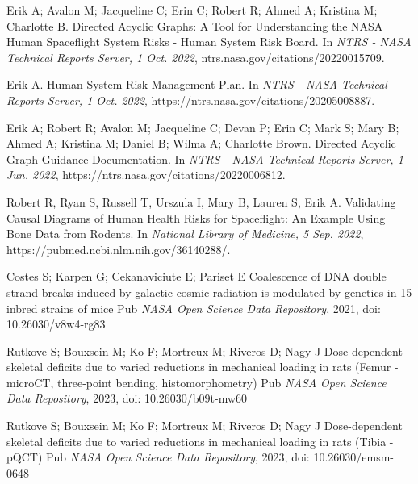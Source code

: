 \documentclass{article}
\begin{document}
  


\begin{thebibliography}{1}


\bibitem{}
Erik A; Avalon M; Jacqueline C; Erin C; Robert R; Ahmed A; Kristina M; Charlotte B.
\newblock Directed Acyclic Graphs: A Tool for Understanding the NASA Human Spaceflight System Risks - Human System Risk Board.
\newblock In {\em NTRS - NASA Technical Reports Server, 1 Oct. 2022}, ntrs.nasa.gov/citations/20220015709.

\bibitem{}
Erik A.
\newblock Human System Risk Management Plan.
\newblock In {\em NTRS - NASA Technical Reports Server, 1 Oct. 2022}, https://ntrs.nasa.gov/citations/20205008887.

\bibitem{}
Erik A; Robert R; Avalon M; Jacqueline C; Devan P; Erin C; Mark S; Mary B; Ahmed A; Kristina M; Daniel B; Wilma A; Charlotte Brown.
\newblock Directed Acyclic Graph Guidance Documentation.
\newblock In {\em NTRS - NASA Technical Reports Server, 1 Jun. 2022}, https://ntrs.nasa.gov/citations/20220006812.

\bibitem{}
Robert R, Ryan S, Russell T, Urszula I, Mary B, Lauren S, Erik A.
\newblock Validating Causal Diagrams of Human Health Risks for Spaceflight: An Example Using Bone Data from Rodents.
\newblock In {\em National Library of Medicine, 5 Sep. 2022}, https://pubmed.ncbi.nlm.nih.gov/36140288/.

\bibitem{}
Costes S; Karpen G; Cekanaviciute E; Pariset E
\newblock Coalescence of DNA double strand breaks induced by galactic cosmic radiation is modulated by genetics in 15 inbred strains of mice
\newblock Pub {\em NASA Open Science Data Repository}, 2021, doi: 10.26030/v8w4-rg83

\bibitem{}
Rutkove S; Bouxsein M; Ko F; Mortreux M; Riveros D; Nagy J
\newblock Dose-dependent skeletal deficits due to varied reductions in mechanical loading in rats (Femur - microCT, three-point bending, histomorphometry)
\newblock Pub {\em NASA Open Science Data Repository}, 2023, doi: 10.26030/b09t-mw60

\bibitem{}
Rutkove S; Bouxsein M; Ko F; Mortreux M; Riveros D; Nagy J
\newblock Dose-dependent skeletal deficits due to varied reductions in mechanical loading in rats (Tibia - pQCT)
\newblock Pub {\em NASA Open Science Data Repository}, 2023, doi: 10.26030/emsm-0648


\end{thebibliography}
\end{document}

